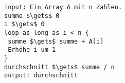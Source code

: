 %
%
\begin{minipage}{\linewidth}
\begin{lstlisting}[language=pseudocode, caption={Algorithmus für das Problem \protect\autoref{problem-durchschnitt-n-zahlen}}, label={lst-algo-durchschnitt-n-zahlen}]
input: Ein Array A mit n Zahlen.
summe $\gets$ 0
i $\gets$ 0
loop as long as i < n {
 summe $\gets$ summe + A[i]
 Erhöhe i um 1
}
durchschnitt $\gets$ summe / n
output: durchschnitt
\end{lstlisting}
\end{minipage}
